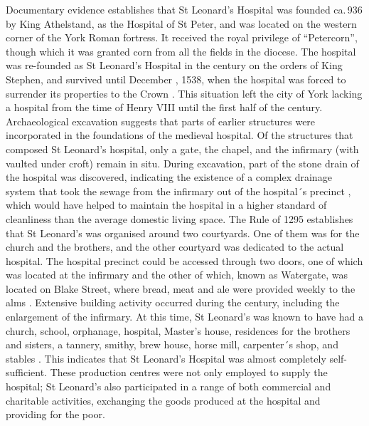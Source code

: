 \documentclass[%
	]{ijsra}
\renewcommand\AD{\xspace}
\begin{document}
Documentary evidence establishes that St Leonard’s Hospital was founded ca.\,936 by King Athelstand, as the Hospital of St Peter, and was located on the western corner of the York Roman fortress. It received the royal privilege of “Petercorn”, though which it was granted corn from all the fields in the diocese. The hospital was re-founded as St Leonard’s Hospital in the  century\AD on the orders of King Stephen, and survived until December , 1538, when the hospital was forced to surrender its properties to the Crown 
\parencite[288]{Palliser_2014}. This situation left the city of York lacking a hospital from the time of Henry VIII until the first half of the  century\AD \parencite{YorkMuseumGardens_2016}.
Archaeological excavation suggests that parts of earlier structures were incorporated in the foundations of the medieval hospital. Of the structures that composed St Leonard’s hospital, only a gate, the chapel, and the infirmary (with vaulted under croft) remain in situ. During excavation, part of the stone drain of the hospital was discovered, indicating the existence of a complex drainage system that took the sewage from the infirmary out of the hospital´s precinct \parencite{Johnson_2014}, which would have helped to maintain the hospital in a higher standard of cleanliness than the average domestic living space.
The Rule of 1295 establishes that St Leonard’s was organised around two courtyards. One of them was for the church and the brothers, and the other courtyard was dedicated to the actual hospital. The hospital precinct could be accessed through two doors, one of which was located at the infirmary and the other of which, known as Watergate, was located on Blake Street, where bread, meat and ale were provided weekly to the alms \parencites[8-9,28-29]{Cullum_1991}[17]{Cullum_1999}{Johnson_2014}[151]{Palliser_2014}[116]{Raine_1955}[314]{Rawcliffe_2004}.
Extensive building activity occurred during the  century\AD, including the enlargement of the infirmary. At this time, St Leonard’s was known to have had a church, school, orphanage, hospital, Master’s house, residences for the brothers and sisters, a tannery, smithy, brew house, horse mill, carpenter´s shop, and stables 
\parencites[99]{Dean_2008}[116]{Raine_1955}. This indicates that St Leonard’s Hospital was almost completely self-sufficient. These production centres were not only employed to supply the hospital; St Leonard’s also participated in a range of both commercial and charitable activities, exchanging the goods produced at the hospital and providing for the poor.
\end{document}
